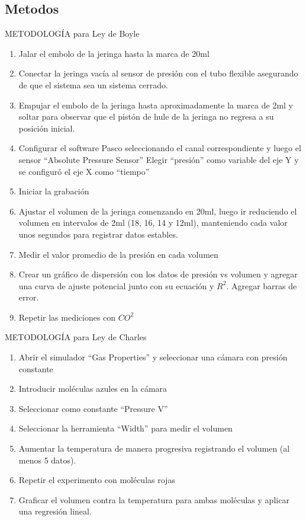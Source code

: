 \documentclass[12pt,a4paper]{config/myConfig}
\begin{document}


\subsection{Metodos}
\label{sec:METODOS}

METODOLOGÍA para Ley de Boyle  
\begin{enumerate}
    \item Jalar el embolo de la jeringa hasta la marca de 20ml 
    \item Conectar la jeringa vacía al sensor de presión con el tubo flexible asegurando de que el sistema sea un sistema cerrado.  
    \item Empujar el embolo de la jeringa hasta aproximadamente la marca de 2ml y soltar para observar que el pistón de hule de la jeringa no regresa a su posición inicial.  
    \item Configurar el software Pasco seleccionando el canal correspondiente y luego el sensor “Absolute Pressure Sensor” Elegir “presión” como variable del eje Y y se configuró el eje X como “tiempo” 
    \item Iniciar la grabación  
    \item Ajustar el volumen de la jeringa comenzando en 20ml, luego ir reduciendo el volumen en intervalos de 2ml (18, 16, 14 y 12ml), manteniendo cada valor unos segundos para registrar datos estables. \item Medir el valor promedio de la presión en cada volumen  
    \item Crear un gráfico de dispersión con los datos de presión vs volumen y agregar una curva de ajuste potencial junto con su ecuación y $R^2$. Agregar barras de error.
    \item Repetir las mediciones con $CO^2$ 
\end{enumerate}

METODOLOGÍA para Ley de Charles
\begin{enumerate}
    \item Abrir el simulador “Gas Properties” y seleccionar una cámara con presión constante  
    \item Introducir moléculas azules en la cámara  
    \item Seleccionar como constante “Pressure V” 
    \item Seleccionar la herramienta “Width” para medir el volumen 
    \item Aumentar la temperatura de manera progresiva registrando el volumen (al menos 5 datos).  
    \item Repetir el experimento con moléculas rojas 
    \item Graficar el volumen contra la temperatura para ambas moléculas y aplicar una regresión lineal.  
\end{enumerate}
\end{document}
